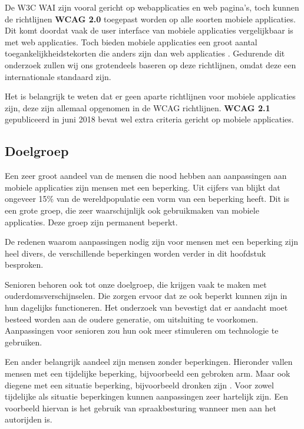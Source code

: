 De W3C WAI zijn vooral gericht op webapplicaties en web pagina's, toch kunnen de richtlijnen \textbf{WCAG 2.0} toegepast worden op alle soorten mobiele applicaties. Dit komt doordat vaak de user interface van mobiele applicaties vergelijkbaar is met web applicaties. Toch bieden mobiele applicaties een groot aantal toegankelijkheidstekorten die anders zijn dan web applicaties \autocite{w3mobileConsider}. Gedurende dit onderzoek zullen wij ons grotendeels baseren op deze richtlijnen, omdat deze een internationale standaard zijn.

Het is belangrijk te weten dat er geen aparte richtlijnen voor mobiele applicaties zijn, deze zijn allemaal opgenomen in de WCAG richtlijnen. \textbf{WCAG 2.1} gepubliceerd in juni 2018 bevat wel extra criteria gericht op mobiele applicaties.
\autocite{w3cMobileGuidelines}

\subsection{Doelgroep}
\label{sec:doelgroep}

Een zeer groot aandeel van de mensen die nood hebben aan aanpassingen aan mobiele applicaties zijn mensen met een beperking.  Uit cijfers van \textcite{who2018} blijkt dat ongeveer 15\% van de wereldpopulatie  een vorm van een beperking heeft. Dit is een grote groep, die zeer waarschijnlijk ook gebruikmaken van mobiele applicaties. Deze groep zijn permanent beperkt.

De redenen waarom aanpassingen nodig zijn voor mensen met een beperking zijn heel divers, de verschillende beperkingen worden verder in dit hoofdstuk besproken.

Senioren behoren ook tot onze doelgroep, die krijgen vaak te maken met ouderdomsverschijnselen. Die zorgen ervoor dat ze ook beperkt kunnen zijn in hun dagelijks functioneren. Het onderzoek van \textcite{diaz2014accessibility} bevestigt dat er aandacht moet besteed worden aan de oudere generatie, om uitsluiting te voorkomen. Aanpassingen voor senioren zou hun ook meer stimuleren om technologie te gebruiken.


Een ander belangrijk aandeel zijn mensen zonder beperkingen. Hieronder vallen mensen met een tijdelijke beperking, bijvoorbeeld een gebroken arm. Maar ook diegene met een situatie beperking, bijvoorbeeld dronken zijn \autocite{inclusiveMicrosoft}. Voor zowel tijdelijke als situatie beperkingen kunnen aanpassingen zeer hartelijk zijn.  Een voorbeeld hiervan is het gebruik van spraakbesturing wanneer men aan het autorijden is.

